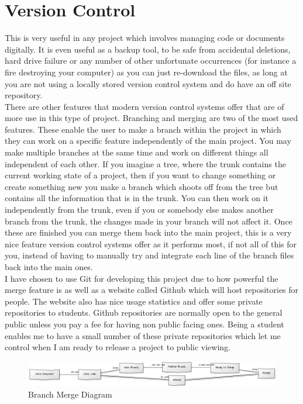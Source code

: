 \section{Version Control}
This is very useful in any project which involves managing code or documents digitally.  It is even useful as a backup tool, to be safe from accidental deletions, hard drive failure or any number of other unfortunate occurrences (for instance a fire destroying your computer) as you can just re-download the files, as long at you are not using a locally stored version control system and do have an off site repository.
\\There are other features that modern version control systems offer that are of more use in this type of project.  Branching and merging are two of the most used features.  These enable the user to make a branch within the project in which they can work on a specific feature independently of the main project.  You may make multiple branches at the same time and work on different things all independent of each other.  If you imagine a tree, where the trunk contains the current working state of a project, then if you want to change something or create something new you make a branch which shoots off from the tree but contains all the information that is in the trunk.  You can then work on it independently from the trunk, even if you or somebody else makes another branch from the trunk, the changes made in your branch will not affect it.  Once these are finished you can merge them back into the main project, this is a very nice feature version control systems offer as it performs most, if not all of this for you, instead of having to manually try and integrate each line of the branch files back into the main ones.
\\I have chosen to use Git for developing this project due to how powerful the merge feature is as well as a website called Github \cite{github} which will host repositories for people.  The website also has nice usage statistics and offer some private repositories to students.  Github repositories are normally open to the general public unless you pay a fee for having non public facing ones.  Being a student enables me to have a small number of these private repositories which let me control when I am ready to release a project to public viewing.
\begin{figure}[h]
\centering
        \includegraphics[width=6.0in] {Images/git-branch-merge.png}
        \caption{Branch Merge Diagram}
        \label{Branch Merge Diagram}
\end{figure}
